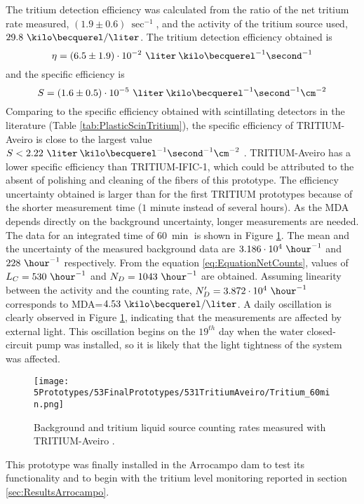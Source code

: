 The tritium detection efficiency was calculated from the ratio of the net tritium rate measured, $(1.9 \pm 0.6)~\sec^{-1}$, and the activity of the tritium source used, $29.8~\kilo\becquerel/\liter$. The tritium detection efficiency obtained is $$\eta=(6.5 \pm 1.9)\cdot{} 10^{-2}~\liter\:\kilo\becquerel^{-1}\second^{-1}$$ and the specific efficiency is
$$S=(1.6 \pm 0.5)\cdot{} 10^{-5}~\liter\:\kilo\becquerel^{-1}\second^{-1}\cm^{-2}$$ 
Comparing to the specific efficiency obtained with scintillating detectors in the literature (Table \ref{tab:PlasticScinTritium}), the specific efficiency of TRITIUM-Aveiro is close to the largest value $S<2.22~\liter\:\kilo\becquerel^{-1}\second^{-1}\cm^{-2}$ \cite{Hofstetter1, Hofstetter2}. TRITIUM-Aveiro has a lower specific efficiency than TRITIUM-IFIC-1, which could be attributed to the absent of polishing and cleaning of the fibers of this prototype. The efficiency uncertainty obtained is larger than for the first TRITIUM prototypes because of the shorter measurement time ($1$ minute instead of several hours). As the MDA depends directly on the background uncertainty, longer measurements are needed. The data for an integrated time of $60~\min$ is shown in Figure \ref{fig:Tritium60min}. The mean and the uncertainty of the measured background data are $3.186 \cdot{} 10^{4}~\hour^{-1}$ and $228~\hour^{-1}$ respectively. From the equation \ref{eq:EquationNetCounts}, values of $L_C=530~\hour^{-1}$ and $N_D=1043~\hour^{-1}$ are obtained. Assuming linearity between the activity and the counting rate, $N_D'=3.872\cdot{}10^4~\hour^{-1}$ corresponds to MDA=$4.53~\kilo\becquerel/\liter$. A daily oscillation is clearly observed in Figure \ref{fig:Tritium60min}, indicating that the measurements are affected by external light. This oscillation begins on the $19^{th}$ day when the water closed-circuit pump was installed, so it is likely that the light tightness of the system was affected.
\begin{figure}[h]
\centering
\texttt{[image: 5Prototypes/53FinalPrototypes/531TritiumAveiro/Tritium\_60min.png]}
\caption{Background and tritium liquid source counting rates measured with TRITIUM-Aveiro \cite{ExperimentalPaperCarlos} \label{fig:Tritium60min}.}
\end{figure}
This prototype was finally installed in the Arrocampo dam to test its functionality and to begin with the tritium level monitoring reported in section \ref{sec:ResultsArrocampo}.